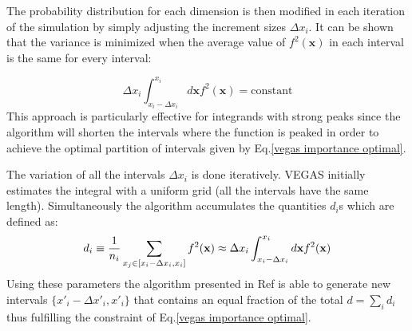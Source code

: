 \documentclass[../main/main.tex]{subfiles}
\begin{document}
The probability distribution for each dimension is then modified in each iteration of the simulation by simply adjusting the increment sizes $\Delta x_i$.  It can be shown that the variance is minimized when the average value of $f^2(\textbf{x})$ in each interval is the same for every interval:

\begin{equation}
	\label{vegas importance optimal}
	\Delta x_i \int_{x_i - \Delta x_i}^{x_i} d\textbf{x} f^2(\textbf{x}) = \text{constant}
\end{equation}
This approach is particularly effective for integrands with strong peaks since the algorithm will shorten the intervals where the function is peaked in order to achieve the optimal partition of intervals given by Eq.\eqref{vegas importance optimal}.

The variation of all the intervals $\Delta x_i$ is done iteratively. 
VEGAS initially estimates the integral with a uniform grid (all the intervals have the same length). Simultaneously the algorithm  accumulates the quantities $d_i$s which are defined as:
\begin{equation}
	d_i \equiv \frac{1}{n_i} \sum_{x_j \in \interval{x_i - \Delta x_i}{x_i} } f^2(\textbf{x}) \approx \Delta x_i \int_{x_i - \Delta x_i}^{x_i} d\textbf{x} f^2(\textbf{x}) 
\end{equation}
Using these parameters the algorithm presented in Ref\cite{Lepage:2020tgj} is able to generate new intervals $\{x'_i - \Delta x'_i, x'_i \}$ that contains an equal fraction of the total $d = \sum_i d_i$ thus fulfilling the constraint of Eq.\eqref{vegas importance optimal}.
\end{document}
